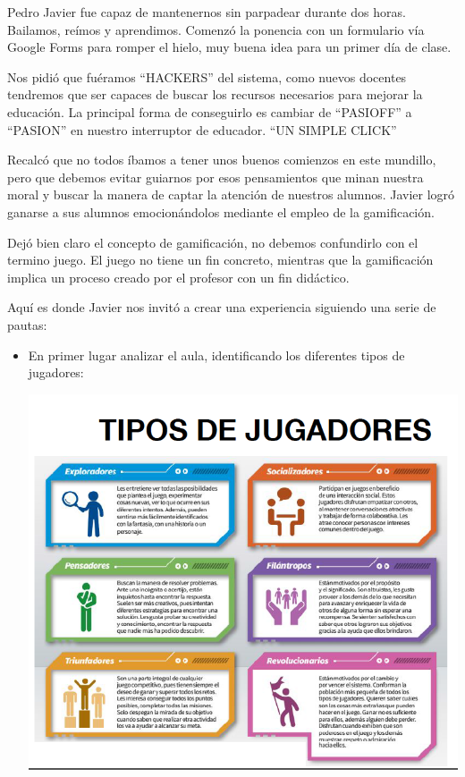 \begin{opin}{\pedrocolor}{Pedro}
Javier fue capaz de mantenernos  sin parpadear durante dos horas. Bailamos, reímos  y aprendimos. Comenzó la ponencia con un formulario vía Google Forms para romper el hielo, muy buena idea para un primer día de clase.

Nos pidió que fuéramos “HACKERS” del sistema, como nuevos docentes tendremos que ser capaces de buscar los recursos necesarios para mejorar la educación. La principal forma de conseguirlo es cambiar de “PASIOFF” a “PASION” en nuestro interruptor de educador. “UN SIMPLE CLICK”

Recalcó que no todos íbamos a tener unos buenos comienzos en este mundillo, pero que debemos evitar guiarnos por esos pensamientos que minan nuestra moral y buscar la manera de captar la atención de nuestros alumnos. Javier logró ganarse a sus alumnos emocionándolos mediante el empleo de la gamificación.

Dejó bien claro el concepto de gamificación, no debemos confundirlo con el termino juego. El juego no tiene un fin concreto, mientras que la gamificación implica un proceso creado por el profesor con un fin didáctico.

Aquí es donde Javier nos invitó a crear una experiencia siguiendo una serie de pautas:

\begin{itemize}

\item En primer lugar analizar el aula, identificando los diferentes tipos de jugadores: 

\begin{minipage}[hbtp]{1.0\linewidth}
\centering
\includegraphics[scale=0.45]{img/gamingpedro2.png}
\end{minipage}


\end{itemize}
\end{opin}
